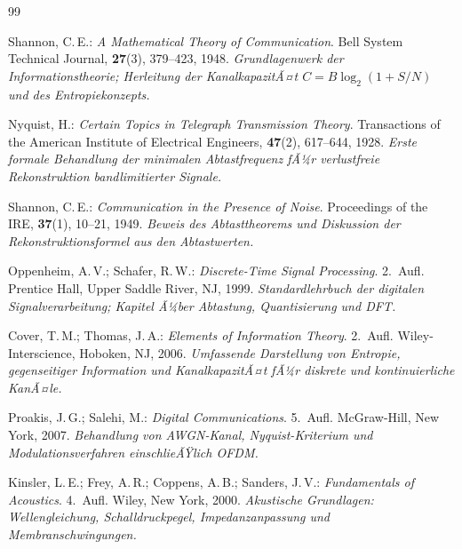 ﻿\documentclass[12pt,a4paper,titlepage]{report}
\begin{document}
\newpage
\begin{thebibliography}{99}


Shannon, C.\,E.:
\textit{A Mathematical Theory of Communication}.
Bell System Technical Journal, \textbf{27}(3), 379--423, 1948.
\newline\textit{Grundlagenwerk der Informationstheorie; Herleitung der KanalkapazitÃ¤t
$C = B\log_2(1+S/N)$ und des Entropiekonzepts.}

Nyquist, H.:
\textit{Certain Topics in Telegraph Transmission Theory}.
Transactions of the American Institute of Electrical Engineers, \textbf{47}(2),
617--644, 1928.
\newline\textit{Erste formale Behandlung der minimalen Abtastfrequenz fÃ¼r
verlustfreie Rekonstruktion bandlimitierter Signale.}

Shannon, C.\,E.:
\textit{Communication in the Presence of Noise}.
Proceedings of the IRE, \textbf{37}(1), 10--21, 1949.
\newline\textit{Beweis des Abtasttheorems und Diskussion der
Rekonstruktionsformel aus den Abtastwerten.}

Oppenheim, A.\,V.; Schafer, R.\,W.:
\textit{Discrete-Time Signal Processing}. 2.~Aufl.
Prentice Hall, Upper Saddle River, NJ, 1999.
\newline\textit{Standardlehrbuch der digitalen Signalverarbeitung; Kapitel
Ã¼ber Abtastung, Quantisierung und DFT.}

Cover, T.\,M.; Thomas, J.\,A.:
\textit{Elements of Information Theory}. 2.~Aufl.
Wiley-Interscience, Hoboken, NJ, 2006.
\newline\textit{Umfassende Darstellung von Entropie, gegenseitiger Information
und KanalkapazitÃ¤t fÃ¼r diskrete und kontinuierliche KanÃ¤le.}

Proakis, J.\,G.; Salehi, M.:
\textit{Digital Communications}. 5.~Aufl.
McGraw-Hill, New York, 2007.
\newline\textit{Behandlung von AWGN-Kanal, Nyquist-Kriterium und
Modulationsverfahren einschlieÃŸlich OFDM.}

Kinsler, L.\,E.; Frey, A.\,R.; Coppens, A.\,B.; Sanders, J.\,V.:
\textit{Fundamentals of Acoustics}. 4.~Aufl.
Wiley, New York, 2000.
\newline\textit{Akustische Grundlagen: Wellengleichung, Schalldruckpegel,
Impedanzanpassung und Membranschwingungen.}


\end{thebibliography}
\end{document}
